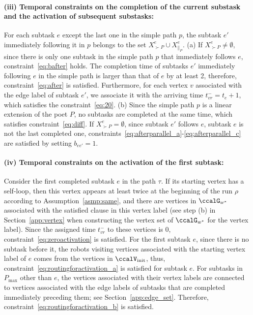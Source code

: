 \documentclass[Afour,sageh,times]{sagej}
\begin{document}
{{\paragraph{(iii) Temporal constraints on the completion of the
current substask and the activation of subsequent
substasks:}
For each subtask $e$ except the last one in the simple path $p$, the subtask $e'$ immediately following it in $p$  belongs to the set $X_{\succ P}^e \cup X_{\|_P}^e$. (a) If $X_{\succ P}^e \neq \emptyset$, since there is only one subtask in the simple path $p$ that immediately follows $e$, constraint~\eqref{eq:bafter} holds. The completion time  of subtasks $e'$ immediately following  $e$ in the simple path is larger than that of $e$ by at least 2, therefore, constraint~\eqref{eq:after} is satisfied. %
Furthermore, for each vertex $v$ associated with the edge label of subtask $e'$, we associate it with the arriving time $t_{vr}^- = t_{e}+1$, which satisfies the constraint~\eqref{eq:20}. (b) Since the simple path $p$ is a linear extension of the poet $P$, no subtasks are completed at the same time, which satisfies constraint~\eqref{eq:diff}. If $X_{\succ P}^e = \emptyset$, since subtask $e'$ follows $e$, subtask $e$ is not the last completed one, constraints~\eqref{eq:afterparallel_a}-\eqref{eq:afterparallel_c} are satisfied by setting $b_{ee'}=1$. %

\paragraph{(iv) Temporal constraints on the activation of the first subtask:}
Consider the first completed subtask $e$ in the path $\tau$. If its starting vertex has a self-loop, then this vertex  appears at least twice at the beginning of  the run $\rho$ according to Assumption~\ref{asmp:same}, and  there are vertices in $\ccalG_{w^*}$ associated with the satisfied clause in this vertex label (see step (b) in Section~\ref{app:vertex} when constructing the vertex set of $\ccalG_{w^*}$ for the vertex label). Since the assigned time $t_{vr}^-$ to these vertices is 0, constraint~\eqref{eq:zeroactivation} is satisfied. For the first subtask $e$, since there is no subtask before it, the robots  visiting vertices associated with the starting vertex label of $e$ comes from the vertices in $\ccalV_{\text{init}}$, thus, constraint~\eqref{eq:routingforactivation_a} is satisfied for subtask $e$. For subtasks in $P_{\text{max}}$ other than $e$, the vertices associated with their vertex labels are connected to vertices associated with the edge labels of subtasks that are completed immediately preceding them; see Section~\ref{app:edge_set}. Therefore, constraint~\eqref{eq:routingforactivation_b} is satisfied.


}}
\end{document}
